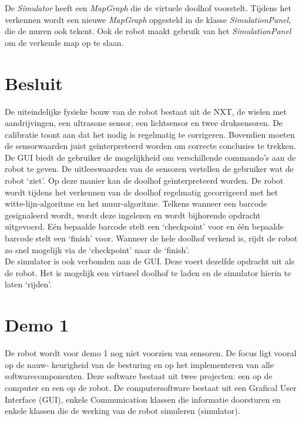 \documentclass[t1]{penoverslag}
\begin{document}
De \textit{Simulator} heeft een \textit{MapGraph} die de virtuele doolhof voorstelt. Tijdens het verkennen wordt een nieuwe \textit{MapGraph} opgesteld in de klasse \textit{SimulationPanel}, die de muren ook tekent. Ook de robot maakt gebruik van het \textit{SimulationPanel} om de verkende map op te slaan.

\section{Besluit} %
\label{sec:besl}
De uiteindelijke fysieke bouw van de robot bestaat uit de NXT, de wielen met aandrijvingen, een ultrasone sensor, een lichtsensor en twee druksensoren. De calibratie toont aan dat het nodig is regelmatig te corrigeren. Bovendien moeten de sensorwaarden juist ge\"interpreteerd worden om correcte conclusies te trekken.\\

De GUI biedt de gebruiker de mogelijkheid om verschillende commando's aan de robot te geven. De uitleeswaarden van de sensoren vertellen de gebruiker wat de robot `ziet'. Op deze manier kan de doolhof ge\"interpreteerd worden. De robot wordt tijdens het verkennen van de doolhof regelmatig gecorrigeerd met het witte-lijn-algoritme en het muur-algoritme. Telkens wanneer een barcode gesignaleerd wordt, wordt deze ingelezen en wordt bijhorende opdracht uitgevoerd. E\'en bepaalde barcode stelt een `checkpoint' voor en \'e\'en bepaalde barcode stelt een `finish' voor. Wanneer de hele doolhof verkend is, rijdt de robot zo snel mogelijk via de `checkpoint' naar de `finish'.\\

De simulator is ook verbonden aan de GUI. Deze voert dezelfde opdracht uit als de robot. Het is mogelijk een virtueel doolhof te laden en de simulator hierin te laten `rijden'.


\newpage
\makeappendix

\section{Demo 1} %
\label{Asec:demo1}
De robot wordt voor demo 1 nog niet voorzien van sensoren. De focus ligt vooral op de nauw-
keurigheid van de besturing en op het implementeren van alle softwarecomponenten. Deze software
bestaat uit twee projecten: een op de computer en een op de robot. De computersoftware bestaat
uit een Grafical User Interface (GUI), enkele Communication klassen die informatie doorsturen en
enkele klassen die de werking van de robot simuleren (simulator).
\end{document}
